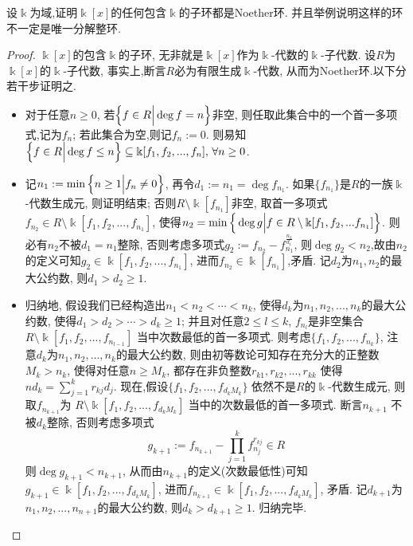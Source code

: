 \documentclass[oneside,a4papar,11pt,UTF8]{book}
\begin{document}
\begin{enumerate}
  \begin{prob}\label{ex-15-1-9}
    设$\Bbbk$为域,证明$\Bbbk[x]$的任何包含$\Bbbk$的子环都是Noether环.
    并且举例说明这样的环不一定是唯一分解整环.
  \end{prob}

  \begin{proof}
    $\Bbbk[x]$的包含$\Bbbk$的子环,
    无非就是$\Bbbk[x]$作为$\Bbbk$-代数的$\Bbbk$-子代数.
    设$R$为$\Bbbk[x]$的$\Bbbk$-子代数,
    事实上,断言$R$必为有限生成$\Bbbk$-代数,
    从而为Noether环.以下分若干步证明之.

    \begin{itemize}
      \item 对于任意$n\geq 0$,
      若$\Big\{ f\in R \Big| \deg f=n \Big\}$非空,
      则任取此集合中的一个首一多项式,记为$f_n$;
      若此集合为空,则记$f_n:=0$.
      则易知$\Big\{ f\in R \Big| \deg f\leq n \Big\}
      \subseteq\Bbbk[f_1,f_2,...,f_n],\,\forall n\geq 0$.

      \item 记$n_1:=\min\Big\{ n\geq 1 \Big| f_n\neq 0 \Big\}$,
      再令$d_1:=n_1=\deg f_{n_1}$.
      如果$\{f_{n_1}\}$是$R$的一族$\Bbbk$-代数生成元,
      则证明结束;
      否则$R\setminus\Bbbk[f_{n_1}]$非空,
      取首一多项式$f_{n_2}\in R\setminus\Bbbk[f_1,f_2,...,f_{n_1}]$,
      使得$n_2=\min\Big\{ \deg g \Big| f\in R\setminus\Bbbk[f_1,f_2,...f_{n_1}] \Big\}$.
      则必有$n_2$不被$d_1=n_1$整除,
      否则考虑多项式$g_2:=f_{n_2}-f_{n_1}^{\frac{n_2}{d_1}}$,
      则$\deg g_2<n_2$,故由$n_2$的定义可知$g_2\in\Bbbk[f_1,f_2,...,f_{n_1}]$,
      进而$f_{n_2}\in\Bbbk[f_{n_1}]$,矛盾.
      记$d_2$为$n_1,n_2$的最大公约数,
      则$d_1>d_2\geq 1$.

      \item 归纳地,
      假设我们已经构造出$n_1<n_2<\cdots<n_k$,
      使得$d_k$为$n_1,n_2,...,n_k$的最大公约数,
      使得$d_1>d_2>\cdots>d_k\geq 1$;
      并且对任意$2\leq l\leq k$,
      $f_{n_l}$是非空集合$R\setminus\Bbbk[f_{1},f_{2},...,f_{n_{l-1}}]$
      当中次数最低的首一多项式.
      则考虑$\{f_1,f_2,...,f_{n_k}\}$,
      注意$d_k$为$n_1,n_2,...,n_k$的最大公约数,
      则由初等数论可知存在充分大的正整数$M_k>n_k$,
      使得对任意$n\geq M_k$,
      都存在非负整数$r_{k1},r_{k2},...,r_{kk}$
      使得$nd_k=\sum_{j=1}^{k}r_{kj}d_j$.
      现在,假设$\{f_1,f_2,...,f_{d_kM_k}\}$
      依然不是$R$的$\Bbbk$-代数生成元,
      则取$f_{n_{k+1}}$为
      $R\setminus\Bbbk[f_1,f_2,...,f_{d_kM_k}]$
      当中的次数最低的首一多项式.
      断言$n_{k+1}$
      不被$d_k$整除,
      否则考虑多项式
      \[g_{k+1}:=f_{n_{k+1}}-\prod_{j=1}^{k}f_{n_j}^{r_{kj}}\in R\]
      则$\deg g_{k+1}<n_{k+1}$,
      从而由$n_{k+1}$的定义(次数最低性)可知
      $g_{k+1}\in\Bbbk[f_1,f_2,...,f_{d_kM_k}]$,
      进而$f_{n_{k+1}}\in\Bbbk[f_1,f_2,...,f_{d_kM_k}]$,
      矛盾.
      记$d_{k+1}$为$n_1,n_2,...,n_{n+1}$的最大公约数,
      则$d_{k}>d_{k+1}\geq 1$.
      归纳完毕.


\end{itemize}
\end{proof}
\end{enumerate}
\end{document}
